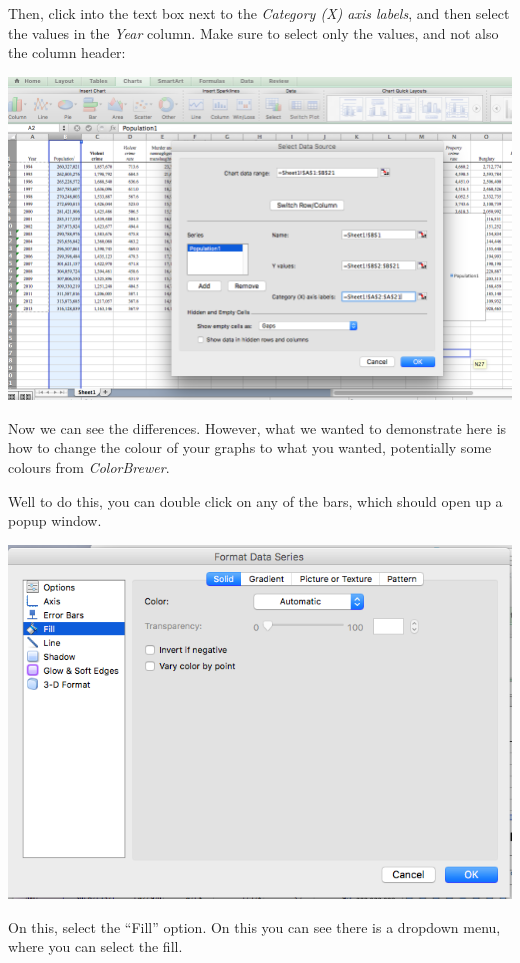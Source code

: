 \documentclass[
]{book}
\begin{document}
Then, click into the text box next to the \emph{Category (X) axis labels}, and then select the values in the \emph{Year} column. Make sure to select only the values, and not also the column header:

\includegraphics{imgs/pb3.png}

Now we can see the differences. However, what we wanted to demonstrate here is how to change the colour of your graphs to what you wanted, potentially some colours from \emph{ColorBrewer}.

Well to do this, you can double click on any of the bars, which should open up a popup window.

\includegraphics{imgs/manual_fill_1.png}

On this, select the ``Fill'' option. On this you can see there is a dropdown menu, where you can select the fill.
\end{document}
